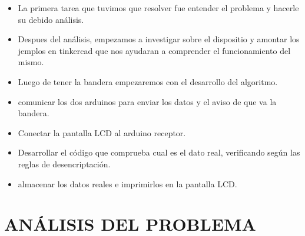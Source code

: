 \documentclass{article}
\begin{document}
\begin{itemize}

    \item La primera tarea que tuvimos que resolver fue entender el problema y hacerle su debido análisis.
    
    \item Despues del análisis, empezamos a investigar sobre el dispositio y amontar los jemplos en tinkercad que nos ayudaran a comprender el funcionamiento del mismo.
    
    \item Luego de tener la bandera empezaremos con el desarrollo del algoritmo.
    
    \item comunicar los dos arduinos para enviar los datos y el aviso de que va la bandera.
    
    \item Conectar la pantalla LCD al arduino receptor.

    \item Desarrollar el código que comprueba cual es el dato real, verificando según las reglas de desencriptación. 
   
   \item almacenar los datos reales e imprimirlos en la pantalla LCD.

    
\end{itemize}


\newpage
\section{ANÁLISIS DEL PROBLEMA}
\label{Análisis}
\end{document}
